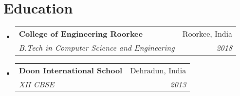 \documentclass[a4paper,11pt]{article}
\makeatletter
\newcommand{\resumeItem}[2]{
  \item\small{
    \textbf{#1}{: #2 \vspace{-2pt}}
  }
}
\newcommand{\resumeSubheading}[4]{
  \vspace{-1pt}\item
    \begin{tabular*}{0.97\textwidth}[t]{l@{\extracolsep{\fill}}r}
      \textbf{#1} & #2 \\
      \textit{\small#3} & \textit{\small #4} \\
    \end{tabular*}\vspace{-5pt}
}
\newcommand{\resumeSubItem}[2]{\resumeItem{#1}{#2}\vspace{-4pt}}
\newcommand{\resumeSubHeadingListStart}{\begin{itemize}[leftmargin=*]}
\newcommand{\resumeSubHeadingListEnd}{\end{itemize}}
\makeatother
\begin{document}
\section{Education}
  \resumeSubHeadingListStart
    \resumeSubheading
      {College of Engineering Roorkee}{Roorkee, India}
      {B.Tech in Computer Science and Engineering}{2018}
    \resumeSubheading
      {Doon International School}{Dehradun, India}
      {XII CBSE}{2013}
  \resumeSubHeadingListEnd





\end{document}
